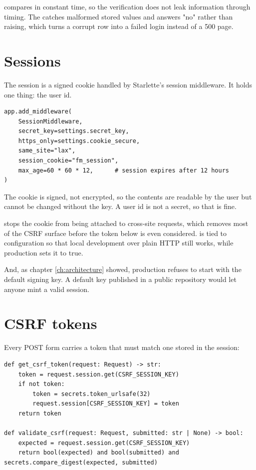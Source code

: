  compares in constant time, so the verification does not leak
information through timing. The  catches malformed stored values
and answers "no" rather than raising, which turns a corrupt row into a failed
login instead of a 500 page.

\section{Sessions}

The session is a signed cookie handled by Starlette's session middleware. It
holds one thing: the user id.

\begin{lstlisting}[style=py]
app.add_middleware(
    SessionMiddleware,
    secret_key=settings.secret_key,
    https_only=settings.cookie_secure,
    same_site="lax",
    session_cookie="fm_session",
    max_age=60 * 60 * 12,      # session expires after 12 hours
)
\end{lstlisting}

The cookie is signed, not encrypted, so the contents are readable by the user
but cannot be changed without the key. A user id is not a secret, so that is
fine.

 stops the cookie from being attached to cross-site
requests, which removes most of the CSRF surface before the token below is even
considered.  is tied to configuration so that local
development over plain HTTP still works, while production sets it to true.

And, as chapter \ref{ch:architecture} showed, production refuses to start with
the default signing key. A default key published in a public repository would
let anyone mint a valid session.

\section{CSRF tokens}

Every POST form carries a token that must match one stored in the session:

\begin{lstlisting}[style=py]
def get_csrf_token(request: Request) -> str:
    token = request.session.get(CSRF_SESSION_KEY)
    if not token:
        token = secrets.token_urlsafe(32)
        request.session[CSRF_SESSION_KEY] = token
    return token

def validate_csrf(request: Request, submitted: str | None) -> bool:
    expected = request.session.get(CSRF_SESSION_KEY)
    return bool(expected) and bool(submitted) and secrets.compare_digest(expected, submitted)
\end{lstlisting}

